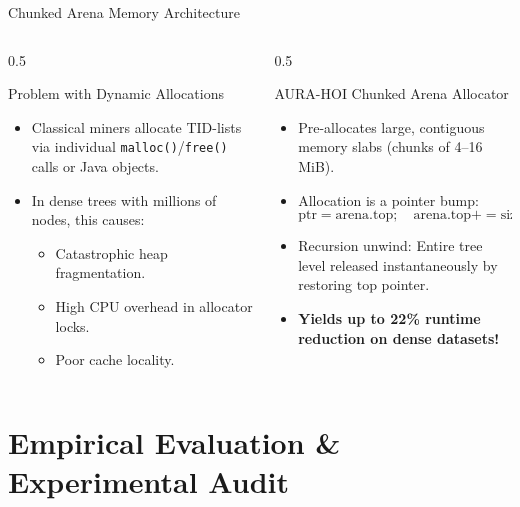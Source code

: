 \documentclass[aspectratio=169,10pt]{beamer}
\newcommand{\AURA}{\textsc{AURA-HOI}}
\begin{document}
\begin{frame}{Chunked Arena Memory Architecture}
  \begin{columns}[T]
    \begin{column}{0.5\textwidth}
      \begin{block}{Problem with Dynamic Allocations}
        \begin{itemize}
          \item Classical miners allocate TID-lists via individual \texttt{malloc()}/\texttt{free()} calls or Java objects.
          \item In dense trees with millions of nodes, this causes:
            \begin{itemize}
              \item Catastrophic heap fragmentation.
              \item High CPU overhead in allocator locks.
              \item Poor cache locality.
            \end{itemize}
        \end{itemize}
      \end{block}
    \end{column}
    \begin{column}{0.5\textwidth}
      \begin{block}{\AURA{} Chunked Arena Allocator}
        \begin{itemize}
          \item Pre-allocates large, contiguous memory slabs (chunks of 4--16 MiB).
          \item Allocation is a pointer bump:
          $$\text{ptr} = \text{arena.top}; \quad \text{arena.top} += \text{size};$$
          \item Recursion unwind: Entire tree level released instantaneously by restoring $\text{top}$ pointer.
          \item \textbf{Yields up to 22\% runtime reduction on dense datasets!}
        \end{itemize}
      \end{block}
    \end{column}
  \end{columns}
\end{frame}

\section{Empirical Evaluation \& Experimental Audit}
\end{document}
